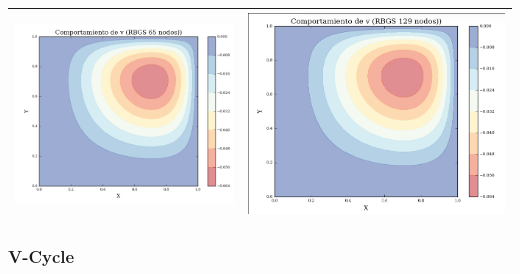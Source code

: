 \documentclass[letter,10pt]{article}
\begin{document}
\begin{table}[H]
\begin{tabular}{|l|l|}
\includegraphics[scale=0.4]{img/v_RBGS65N} & \includegraphics[scale=0.35]{img/v_RBGS129N} \\ \hline
\end{tabular}

\label{cualitrelaxsimple}
\end{table}

\subsubsection{V-Cycle}
\end{document}
